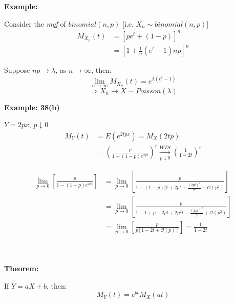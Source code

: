 \documentclass{article}
\begin{document}
\noindent \textbf{Example:} 

Consider the \textit{mgf} of $binomial(n,p)$ [i.e. $X_n \sim binomial(n,p)$]
\begin{equation*}
    \begin{split}
        M_{X_n}(t) &= \left[pe^t + (1-p)\right]^n\\
                    &= \left[1 + \frac{1}{n}(e^t-1)np \right]^n
    \end{split}
\end{equation*}

Suppose $np \to \lambda$, as $n \to \infty$, then:
\begin{equation*}
    \lim_{n\to\infty} M_{X_n}(t) = e^{\lambda(e^t-1)}
\end{equation*}
\begin{equation*}
    \Rightarrow X_n \to X \sim Poisson(\lambda)
\end{equation*}

\noindent \textbf{Example: 38(b)}

$Y = 2px$, $p\downarrow 0$
\begin{equation*}
\begin{split}
    M_Y(t) &= E(e^{2tpx}) = M_X(2tp)\\
        &= \left( \frac{p}{1-(1-p)e^{2pt}} \right)^r \xrightarrow[p \downarrow 0]{WTS} \left(\frac{1}{1-2t}\right)^r
\end{split}
\end{equation*}

\begin{equation*}
\begin{split}
    \lim_{p\to 0} \left[ \frac{p}{1-(1-p)e^{2pt}}\right] &= \lim_{p\to 0} \left[ \frac{p}{1-(1-p)[1+2pt + \frac{(2pt)^2}{2!} + \mathcal{O}(p^2)} \right]\\
   &= \lim_{p\to 0} \left[ \frac{p}{1-1+ p - 2pt + 2p^2t - \frac{(2pt)^2}{2} + \mathcal{O}(p^2)} \right]\\
   &= \lim_{p\to 0} \left[ \frac{p}{p[1-2t+ \mathcal{O}(p)]} \right] = \frac{1}{1-2t}
\end{split}
\end{equation*}

\\~\\

\noindent \textbf{Theorem:}

If $Y= aX + b$, then:
\begin{equation*}
    M_Y(t) =  e^{bt}M_X(at)
\end{equation*}
\end{document}

